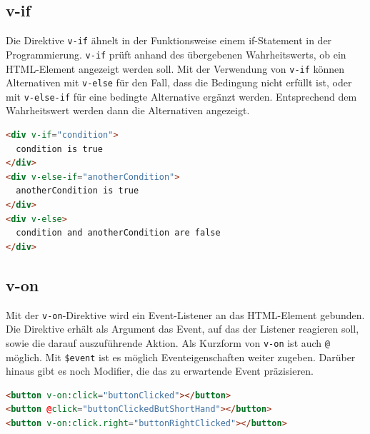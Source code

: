 \subsection*{v-if}
Die Direktive \texttt{v-if} ähnelt in der Funktionsweise einem if-Statement in der Programmierung.
\texttt{v-if} prüft anhand des übergebenen Wahrheitswerts, ob ein HTML-Element angezeigt werden soll.
Mit der Verwendung von \texttt{v-if} können Alternativen mit \texttt{v-else} für den Fall, dass die Bedingung nicht erfüllt ist,
oder mit \texttt{v-else-if} für eine bedingte Alternative ergänzt werden.
Entsprechend dem Wahrheitswert werden dann die Alternativen angezeigt. \cite{vueDirectives}
\begin{lstlisting}[caption={\texttt{v-if}-Direktive},language=html, label={lst:v-if}]
<div v-if="condition">
  condition is true
</div>
<div v-else-if="anotherCondition">
  anotherCondition is true
</div>
<div v-else>
  condition and anotherCondition are false
</div>
\end{lstlisting}

\subsection*{v-on}
Mit der \texttt{v-on}-Direktive wird ein Event-Listener an das HTML-Element gebunden.
Die Direktive erhält als Argument das Event, auf das der Listener reagieren soll,
sowie die darauf auszuführende Aktion.
Als Kurzform von \texttt{v-on} ist auch \texttt{@} möglich.
Mit \texttt{\$event} ist es möglich Eventeigenschaften weiter zugeben.
Darüber hinaus gibt es noch Modifier, die das zu erwartende Event präzisieren. \cite{vueDirectives}
\begin{lstlisting}[caption={\texttt{v-on}-Direktive},language=html, label={lst:v-on}]
<button v-on:click="buttonClicked"></button>
<button @click="buttonClickedButShortHand"></button>
<button v-on:click.right="buttonRightClicked"></button>
\end{lstlisting}



